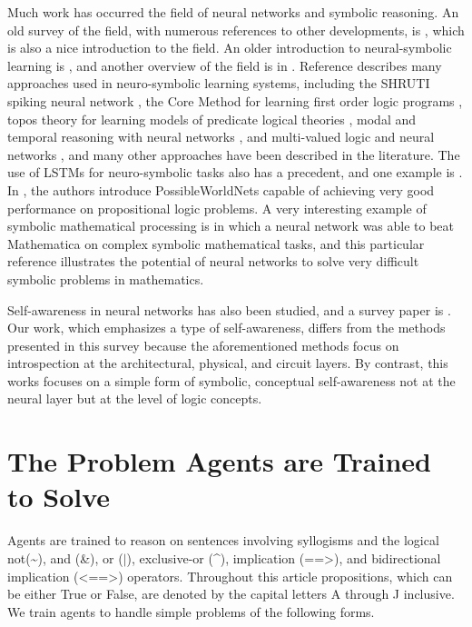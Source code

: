 \documentclass{article}
\begin{document}
Much work has occurred the field of neural networks and symbolic reasoning.
An old survey of the field, with numerous references to other developments, is
\cite{DBLP:journals/corr/abs-1711-03902}, which is also a nice introduction to
the field.
An older introduction to neural-symbolic learning is \cite{neural_symbolic_2002},
and another overview of the field is in
\cite{bica2015_integrated_neural_symbolic}.
Reference
\cite{neural_symbolic_2007} describes many approaches used in neuro-symbolic
learning systems, including the SHRUTI spiking neural network
\cite{shruti_2007}, the Core Method for learning first order logic programs
\cite{core_method_2007}, topos theory for learning models of
predicate logical theories \cite{topos_theory_2007}, modal and temporal
reasoning with neural networks \cite{modal_temporal_2007}, and multi-valued
logic and neural networks \cite{multi_valued_logic_2007}, and many other
approaches have been described in the literature.  The use of LSTMs for
neuro-symbolic tasks also has a precedent,
and one example is \cite{captcha_2017}.
In \cite{DBLP:journals/corr/abs-1802-08535}, the authors introduce PossibleWorldNets
capable of achieving very good performance on propositional logic problems.
A very interesting example of symbolic mathematical processing 
is \cite{lample2019deep} in which a neural network
was able to beat Mathematica on complex symbolic mathematical tasks, and this
particular reference illustrates the potential of neural networks to solve
very difficult symbolic problems in mathematics.  

Self-awareness in neural networks has also been studied, and a survey
paper is \cite{9045930}.  Our work, which emphasizes a type of self-awareness,
differs from the methods presented in this survey because the aforementioned
methods focus on introspection at the architectural, physical, and circuit
layers.  By contrast, this works focuses on a simple form of symbolic, conceptual
self-awareness not at the neural layer but at the level of logic concepts.

\section{The Problem Agents are Trained to Solve}

Agents are trained to reason on sentences involving syllogisms and the logical not(\textasciitilde), and (\&), or ($|$), exclusive-or (\textasciicircum), implication (==\textgreater), and bidirectional implication (\textless==\textgreater) operators. Throughout this article propositions, which can be either True or False, are denoted by the capital letters A through J inclusive. We train agents to handle simple problems of the following forms.
\end{document}

